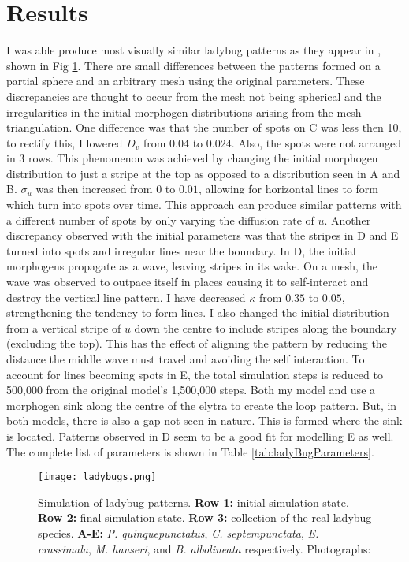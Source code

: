 \section{Results}
I was able produce most visually similar ladybug patterns as they appear in \citep{Liaw2001}, shown in Fig \ref{fig:ladyBugPatterns}. There are small differences between the patterns formed on a partial sphere and an arbitrary mesh using the original parameters. These discrepancies are thought to occur from the mesh not being spherical and the irregularities in the initial morphogen distributions arising from the mesh triangulation. One difference was that the number of spots on C was less then 10, to rectify this, I lowered $D_v$ from $0.04$ to $0.024$. Also, the spots were not arranged in 3 rows. This phenomenon was achieved by changing the initial morphogen distribution to just a stripe at the top as opposed to a distribution seen in A and B. $\sigma_u$ was then increased from $0$ to $0.01$, allowing for horizontal lines to form which turn into spots over time. This approach can produce similar patterns  with a different number of spots by only varying the diffusion rate of $u$. Another discrepancy observed with the initial parameters was that the stripes in D and E turned into spots and irregular lines near the boundary. In D, the initial morphogens propagate as a wave, leaving stripes in its wake. On a mesh, the wave was observed to outpace itself in places causing it to self-interact and destroy the vertical line pattern. I have decreased $\kappa$ from $0.35$ to $0.05$, strengthening the tendency to form lines. I also changed the initial distribution from a vertical stripe of $u$ down the centre to include stripes along the boundary (excluding the top). This has the effect of aligning the pattern by reducing the distance the middle wave must travel and avoiding the self interaction. To account for lines becoming spots in E, the total simulation steps is reduced to 500,000 from the original model's 1,500,000 steps. Both my model and \citep{Liaw2001} use a morphogen sink along the centre of the elytra to create the loop pattern. But, in both models, there is also a gap not seen in nature. This is formed where the sink is located. Patterns observed in D seem to be a good fit for modelling E as well. The complete list of parameters is shown in Table \ref{tab:ladyBugParameters}.

\begin{figure}[!ht]
	\centering
	\texttt{[image: ladybugs.png]}
	\caption{Simulation of ladybug patterns. \textbf{Row 1:} initial simulation state. \textbf{Row 2:} final simulation state. \textbf{Row 3:} collection of the real ladybug species. \textbf{A-E:} \textit{P. quinquepunctatus}, \textit{C. septempunctata}, \textit{E. crassimala}, \textit{M. hauseri}, and \textit{B. albolineata} respectively. \textcolor{citation-gray}{Photographs: \citep{Chen2008}}}
	\label{fig:ladyBugPatterns}
\end{figure}

